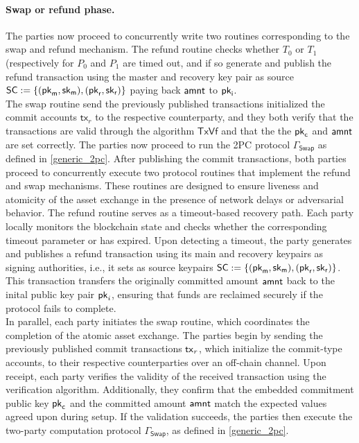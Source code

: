 \paragraph*{Swap or refund phase.}
The parties now proceed to concurrently write two routines corresponding to the swap and refund mechanism. The refund routine checks whether $T_0$ or $T_1$ (respectively for $P_0$ and $P_1$ are timed out, and if so generate and publish the refund transaction using the master and recovery key pair as source $\mathsf{SC} := \{ (\mathsf{pk}_{\mathsf{m}}, \mathsf{sk}_{\mathsf{m}}), (\mathsf{pk}_{\mathsf{r}}, \mathsf{sk}_{\mathsf{r}}) \}$ paying back $\mathsf{amnt}$ to $\mathsf{pk}_{\mathsf{i}}$. \\
The swap routine send the previously published transactions initialized the commit accounts $\mathsf{tx}_r$ to the respective counterparty, and they both verify that the transactions are valid through the algorithm $\mathsf{TxVf}$ and that the the $\mathsf{pk}_{\mathsf{c}}$ and $\mathsf{amnt}$ are set correctly. The parties now proceed to run the 2PC protocol $\Gamma_\mathsf{Swap}$ as defined in \cref{generic_2pc}. 
After publishing the commit transactions, both parties proceed to concurrently execute two protocol routines that implement the refund and swap mechanisms. These routines are designed to ensure liveness and atomicity of the asset exchange in the presence of network delays or adversarial behavior.
The refund routine serves as a timeout-based recovery path. Each party locally monitors the blockchain state and checks whether the corresponding timeout parameter  or  has expired. Upon detecting a timeout, the party generates and publishes a refund transaction using its main and recovery keypairs as signing authorities, i.e., it sets as source keypairs $\mathsf{SC} := \{ (\mathsf{pk}_{\mathsf{m}}, \mathsf{sk}_{\mathsf{m}}), (\mathsf{pk}_{\mathsf{r}}, \mathsf{sk}_{\mathsf{r}}) \}$. This transaction transfers the originally committed amount $\mathsf{amnt}$ back to the inital public key pair $\mathsf{pk}_i$, ensuring that funds are reclaimed securely if the protocol fails to complete. \\
In parallel, each party initiates the swap routine, which coordinates the completion of the atomic asset exchange. The parties begin by sending the previously published commit transactions $\mathsf{tx}_r$, which initialize the commit-type accounts, to their respective counterparties over an off-chain channel. Upon receipt, each party verifies the validity of the received transaction using the verification algorithm. Additionally, they confirm that the embedded commitment public key $\mathsf{pk}_{\mathsf{c}}$ and the committed amount $\mathsf{amnt}$ match the expected values agreed upon during setup. If the validation succeeds, the parties then execute the two-party computation protocol $\Gamma_{\mathsf{Swap}}$, as defined in \cref{generic_2pc}.

